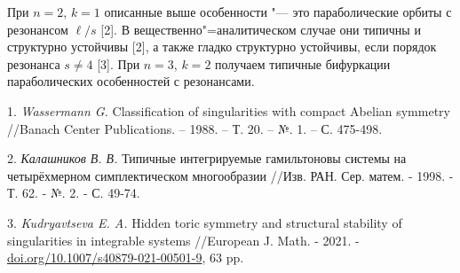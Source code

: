 При $n = 2$, $k = 1$ описанные выше особенности "--- это параболические орбиты с резонансом $\ell/s$ [2]. В вещественно"=аналитическом случае они типичны и структурно устойчивы [2], а также гладко структурно устойчивы, если порядок резонанса $s\ne4$ [3]. При $n = 3$, $k = 2$ получаем типичные бифуркации параболических особенностей с резонансами.

\litlist

1. {\it Wassermann G.} Classification of singularities with com\-pact Abelian symmetry //Banach Center Publications. – 1988. – Т. 20. – №. 1. – С. 475-498.

2. {\it Калашников В. В.} Типичные интегрируемые гамильтоновы системы на четырёхмерном симплектическом многообразии //Изв. РАН. Сер. матем. - 1998. - Т. 62. - №. 2. - С. 49-74.

3. {\it Kudryavtseva E. A.} Hidden toric symmetry and structu\-ral stability of singularities in integrable systems //European J. Math. - 2021. -
\href{https://doi.org/10.1007/s40879-021-00501-9}{doi.org/10.1007/s40879-021-00501-9},
63 pp.
